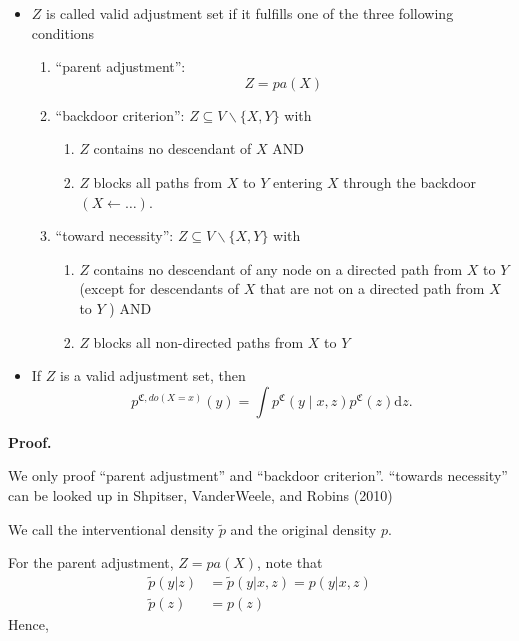 \documentclass[a4paper,12pt,openany]{book}
\providecommand{\tightlist}{%
 \setlength{\itemsep}{0pt}\setlength{\parskip}{0pt}}
\begin{document}
\begin{itemize}
\item
  \(Z\) is called valid adjustment set if it fulfills one of the three following conditions

  \begin{enumerate}
  \def\labelenumi{\arabic{enumi}.}
  \tightlist
  \item
    ``parent adjustment'':
    \[
      {Z}=pa(X)
      \]
  \item
    ``backdoor criterion'': \({Z} \subseteq {V} \backslash\{X, Y\}\) with

    \begin{enumerate}
    \def\labelenumii{(\roman{enumii})}
    \tightlist
    \item
      \({Z}\) contains no descendant of \(X\) AND
    \item
      \({Z}\) blocks all paths from \(X\) to \(Y\) entering \(X\) through the backdoor \((X \leftarrow \ldots)\).
    \end{enumerate}
  \item
    ``toward necessity'': \({Z} \subseteq {V} \backslash\{X, Y\}\) with

    \begin{enumerate}
    \def\labelenumii{(\roman{enumii})}
    \tightlist
    \item
      \({Z}\) contains no descendant of any node on a directed path from \(X\) to \(Y\) (except for descendants of \(X\) that are not on a directed path from \(X\) to \(Y\) ) AND
    \item
      \({Z}\) blocks all non-directed paths from \(X\) to \(Y\)
    \end{enumerate}
  \end{enumerate}
\item
  If \(Z\) is a valid adjustment set, then
  \[
    p^{\mathfrak{C}, d o(X=x)}(y)=\int  p^{\mathfrak{C}}(y \mid x, {z}) p^{\mathfrak{C}}({z}) \mathrm dz.
    \]
\end{itemize}

\textbf{Proof.}

We only proof ``parent adjustment'' and ``backdoor criterion''. ``towards necessity'' can be looked up in Shpitser, VanderWeele, and Robins (2010)

We call the interventional density \(\tilde p\) and the original density \(p\).

For the parent adjustment, \(Z=pa(X)\), note that\\
\begin{align}
\tilde p (y|z)&= \tilde p (y|x,z)= p (y|x,z) \\
\tilde p(z)&= p(z)
\end{align}
Hence,
\end{document}
